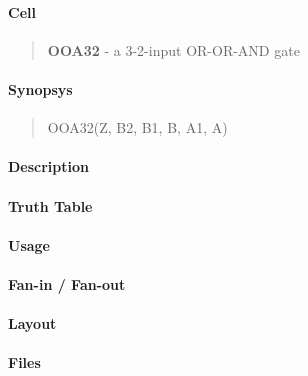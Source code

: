 \label{OOA32}
\paragraph{Cell}
\begin{quote}
    \textbf{OOA32} - a 3-2-input OR-OR-AND gate
\end{quote}

\paragraph{Synopsys}
\begin{quote}
    OOA32(Z, B2, B1, B, A1, A)
\end{quote}

\paragraph{Description}

%

\paragraph{Truth Table}
%

\paragraph{Usage}

\paragraph{Fan-in / Fan-out}

\paragraph{Layout}

\paragraph{Files}
